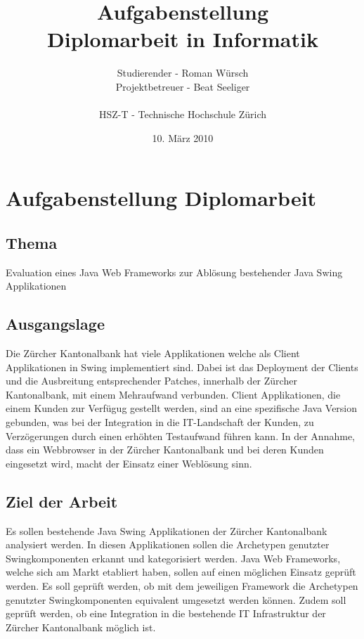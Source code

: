 \documentclass[listof=totoc,bibliography=totoc]{scrreprt}
\title{Aufgabenstellung\\
    Diplomarbeit in Informatik}
\author{Studierender - Roman Würsch\\
    Projektbetreuer - Beat Seeliger\\
    \\
    HSZ-T - Technische Hochschule Zürich}
\date{10. März 2010}
\begin{document}
    \ifpdf
    \else
    \fi

    \maketitle



    \chapter{Aufgabenstellung Diplomarbeit}

    \section{Thema}
    Evaluation eines Java Web Frameworks zur Ablösung bestehender Java Swing
    Applikationen
    
    \section{Ausgangslage}
    Die Zürcher Kantonalbank hat viele Applikationen welche als Client
    Applikationen in Swing implementiert sind. Dabei ist das Deployment der
    Clients und die Ausbreitung entsprechender Patches, innerhalb der Zürcher
    Kantonalbank, mit einem Mehraufwand verbunden. Client Applikationen, die
    einem Kunden zur Verfügug gestellt werden, sind an eine spezifische Java
    Version gebunden, was bei der Integration in die IT-Landschaft der Kunden,
    zu Verzögerungen durch einen erhöhten Testaufwand führen kann. In der
    Annahme, dass ein Webbrowser in der Zürcher Kantonalbank und bei deren
    Kunden eingesetzt wird, macht der Einsatz einer Weblösung sinn.

    \section{Ziel der Arbeit}
    Es sollen bestehende Java Swing Applikationen der Zürcher Kantonalbank
    analysiert werden. In diesen Applikationen sollen die Archetypen genutzter
    Swingkomponenten erkannt und kategorisiert werden. Java Web Frameworks,
    welche sich am Markt etabliert haben, sollen auf einen möglichen Einsatz
    geprüft werden. Es soll geprüft werden, ob mit dem jeweiligen Framework die
    Archetypen genutzter Swingkomponenten equivalent umgesetzt werden können.
    Zudem soll geprüft werden, ob eine Integration in die bestehende IT
    Infrastruktur der Zürcher Kantonalbank möglich ist.
    
\end{document}
